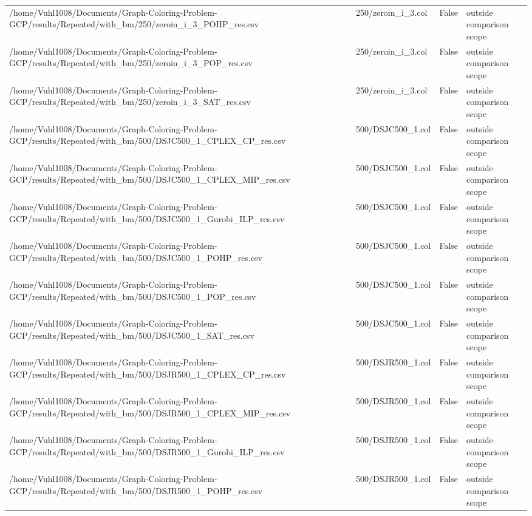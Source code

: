 \begin{table}[htbp]
\begin{tabular}{llll}
/home/Vuhl1008/Documents/Graph-Coloring-Problem-GCP/results/Repeated/with\_bm/250/zeroin\_i\_3\_POHP\_res.csv & 250/zeroin\_i\_3.col & False & outside comparison scope \\
/home/Vuhl1008/Documents/Graph-Coloring-Problem-GCP/results/Repeated/with\_bm/250/zeroin\_i\_3\_POP\_res.csv & 250/zeroin\_i\_3.col & False & outside comparison scope \\
/home/Vuhl1008/Documents/Graph-Coloring-Problem-GCP/results/Repeated/with\_bm/250/zeroin\_i\_3\_SAT\_res.csv & 250/zeroin\_i\_3.col & False & outside comparison scope \\
/home/Vuhl1008/Documents/Graph-Coloring-Problem-GCP/results/Repeated/with\_bm/500/DSJC500\_1\_CPLEX\_CP\_res.csv & 500/DSJC500\_1.col & False & outside comparison scope \\
/home/Vuhl1008/Documents/Graph-Coloring-Problem-GCP/results/Repeated/with\_bm/500/DSJC500\_1\_CPLEX\_MIP\_res.csv & 500/DSJC500\_1.col & False & outside comparison scope \\
/home/Vuhl1008/Documents/Graph-Coloring-Problem-GCP/results/Repeated/with\_bm/500/DSJC500\_1\_Gurobi\_ILP\_res.csv & 500/DSJC500\_1.col & False & outside comparison scope \\
/home/Vuhl1008/Documents/Graph-Coloring-Problem-GCP/results/Repeated/with\_bm/500/DSJC500\_1\_POHP\_res.csv & 500/DSJC500\_1.col & False & outside comparison scope \\
/home/Vuhl1008/Documents/Graph-Coloring-Problem-GCP/results/Repeated/with\_bm/500/DSJC500\_1\_POP\_res.csv & 500/DSJC500\_1.col & False & outside comparison scope \\
/home/Vuhl1008/Documents/Graph-Coloring-Problem-GCP/results/Repeated/with\_bm/500/DSJC500\_1\_SAT\_res.csv & 500/DSJC500\_1.col & False & outside comparison scope \\
/home/Vuhl1008/Documents/Graph-Coloring-Problem-GCP/results/Repeated/with\_bm/500/DSJR500\_1\_CPLEX\_CP\_res.csv & 500/DSJR500\_1.col & False & outside comparison scope \\
/home/Vuhl1008/Documents/Graph-Coloring-Problem-GCP/results/Repeated/with\_bm/500/DSJR500\_1\_CPLEX\_MIP\_res.csv & 500/DSJR500\_1.col & False & outside comparison scope \\
/home/Vuhl1008/Documents/Graph-Coloring-Problem-GCP/results/Repeated/with\_bm/500/DSJR500\_1\_Gurobi\_ILP\_res.csv & 500/DSJR500\_1.col & False & outside comparison scope \\
/home/Vuhl1008/Documents/Graph-Coloring-Problem-GCP/results/Repeated/with\_bm/500/DSJR500\_1\_POHP\_res.csv & 500/DSJR500\_1.col & False & outside comparison scope \\

\end{tabular}
\end{table}
